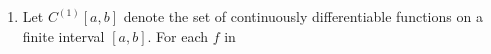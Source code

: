 \documentclass{article}
\begin{document}
\begin{enumerate}
\begin{enumerate}
\begin{proof}
\begin{align*}
                                                         & = \int_\frac{1}{2}^{\frac{1}{2}+\frac{1}{n}}1-n(x-\frac{1}{2})dx                                                                                                    \\
                                                         & = \left.\left(1+\frac{n}{2}\right)x-\frac{nx^2}{2}\right\rvert_\frac{1}{2}^{\frac{1}{2}+\frac{1}{n}}                                                                \\
                                                         & = \left(1+\frac{n}{2}\right){(\frac{1}{2}+\frac{1}{n})}-\frac{n{(\frac{1}{2}+\frac{1}{n})}^2}{2} - \frac{1}{2}\left(1+\frac{n}{2}\right)+\frac{n(\frac{1}{2})^2}{2} \\
                                                         & = \frac{1}{2} + \frac{1}{n} + \frac{n}{4} + \frac{1}{2} - \frac{n}{8} - \frac{1}{2} - \frac{1}{2n} - \frac{1}{2} - \frac{n}{4} + \frac{n}{8}                        \\
                                                         & = \frac{1}{n} + \frac{1}{2n}                                                                                                                                        \\
                                                         & \leq \frac{1}{n}+ \frac{1}{n}                                                                                                                                       \\
                                                         & = \frac{2}{n}                                                                                                                                                       \\
                                                         & \leq \frac{2}{N}                                                                                                                                                    \\
                                                         & \leq \varepsilon
                              \end{align*}
                        \end{proof}
            \end{enumerate}
            \setcounter{enumi}{6}
      \item Let $C^{(1)}[a,b]$ denote the set of continuously differentiable
            functions on a finite interval $[a,b]$. For each $f$ in

\end{enumerate}
\end{document}

